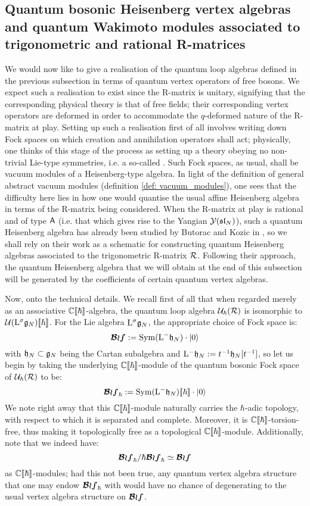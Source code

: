     \subsection{Quantum bosonic Heisenberg vertex algebras and quantum Wakimoto modules associated to trigonometric and rational R-matrices}
        We would now like to give a realisation of the quantum loop algebras defined in the previous subsection in terms of quantum vertex operators of free bosons. We expect such a realisation to exist since the R-matrix is unitary, signifying that the corresponding physical theory is that of free fields; their corresponding vertex operators are deformed in order to accommodate the $q$-deformed nature of the R-matrix at play. Setting up such a realisation first of all involves writing down Fock spaces on which creation and annihilation operators shall act; physically, one thinks of this stage of the process as setting up a theory obeying no non-trivial Lie-type symmetries, i.e. a so-called . Such Fock spaces, as usual, shall be vacuum modules of a Heisenberg-type algebra. In light of the definition of general abstract vacuum modules (definition \ref{def: vacuum_modules}), one sees that the difficulty here lies in how one would quantise the usual affine Heisenberg algebra in terms of the R-matrix being considered. When the R-matrix at play is rational and of type $\mathsf{A}$ (i.e. that which gives rise to the Yangian $\mathcal{Y}(\mathfrak{sl}_N)$), such a quantum Heisenberg algebra has already been studied by Butorac and Kozic in \cite{butorac_kozic_quantum_heisenberg_algebras_associated_with_type_A_rational_R_matrices}, so we shall rely on their work as a schematic for constructing quantum Heisenberg algebras associated to the trigonometric R-matrix $\mathcal{R}$. Following their approach, the quantum Heisenberg algebra that we will obtain at the end of this subsection will be generated by the coefficients of certain quantum vertex algebras.

        Now, onto the technical details. We recall first of all that when regarded merely as an associative $\mathbb{C}[\![\hbar]\!]$-algebra, the quantum loop algebra $\mathcal{U}_{\hbar}(\mathcal{R})$ is isomorphic to $\mathcal{U}(\mathrm{L}^{\sigma}\mathfrak{g}_N)[\![\hbar]\!]$. For the Lie algebra $\mathrm{L}^{\sigma}\mathfrak{g}_N$, the appropriate choice of Fock space is:
            $$\boldsymbol{ \mathcal{Bos} } := \operatorname{Sym}( \mathrm{L}^- \mathfrak{h}_N ) \cdot \lvert {0} \rangle$$
        with $\mathfrak{h}_N \subset \mathfrak{g}_N$ being the Cartan subalgebra and $\mathrm{L}^- \mathfrak{h}_N := t^{-1} \mathfrak{h}_N[t^{-1}]$, so let us begin by taking the underlying $\mathbb{C}[\![\hbar]\!]$-module of the quantum bosonic Fock space of $\mathcal{U}_{\hbar}(\mathcal{R})$ to be:
            $$\boldsymbol{ \mathcal{Bos} }_{\hbar} := \operatorname{Sym}( \mathrm{L}^- \mathfrak{h}_N )[\![\hbar]\!] \cdot \lvert {0} \rangle$$
        We note right away that this $\mathbb{C}[\![\hbar]\!]$-module naturally carries the $\hbar$-adic topology, with respect to which it is separated and complete. Moreover, it is $\mathbb{C}[\![\hbar]\!]$-torsion-free, thus making it topologically free as a topological $\mathbb{C}[\![\hbar]\!]$-module. Additionally, note that we indeed have:
            $$\boldsymbol{ \mathcal{Bos} }_{\hbar}/\hbar \boldsymbol{ \mathcal{Bos} }_{\hbar} \simeq \boldsymbol{ \mathcal{Bos} }$$
        as $\mathbb{C}[\![\hbar]\!]$-modules; had this not been true, any quantum vertex algebra structure that one may endow $\boldsymbol{ \mathcal{Bos} }_{\hbar}$ with would have no chance of degenerating to the usual vertex algebra structure on $\boldsymbol{ \mathcal{Bos} }$.

